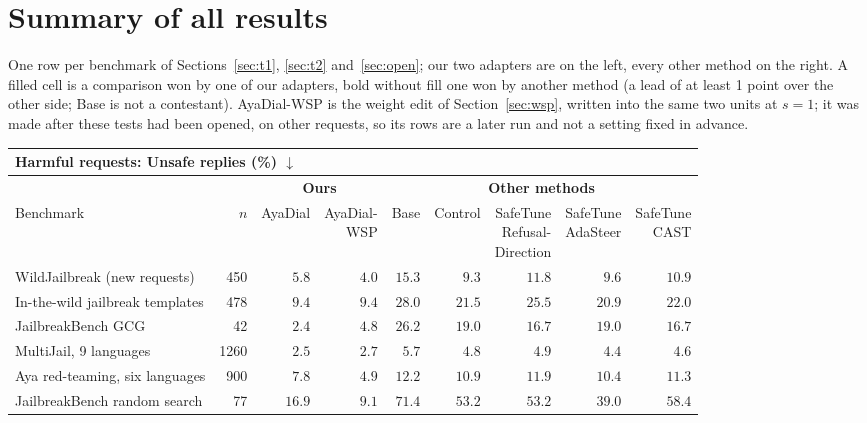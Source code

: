 \documentclass[10pt,a4paper]{article}
\renewcommand{\arraystretch}{1.12}
\begin{document}
\section{Summary of all results}\label{sec:summary}
One row per benchmark of Sections~\ref{sec:t1}, \ref{sec:t2} and~\ref{sec:open}; our two adapters are on the left, every other method on the right. A filled cell is a comparison won by one of our adapters, bold without fill one won by another method (a lead of at least 1 point over the other side; Base is not a contestant). AyaDial-WSP is the weight edit of Section~\ref{sec:wsp}, written into the same two units at $s = 1$; it was made after these tests had been opened, on other requests, so its rows are a later run and not a setting fixed in advance.

\begin{table}[H]\centering\footnotesize\renewcommand{\arraystretch}{1.3}\setlength{\tabcolsep}{4pt}\begin{tabular}{|l|r|r|r||r|r|r|r|r|}\hline
\multicolumn{9}{|l|}{\textbf{Harmful requests: Unsafe replies (\%) $\downarrow$}}\\\hline
\multicolumn{2}{|c|}{} & \multicolumn{2}{c||}{\textbf{Ours}} & \multicolumn{5}{c|}{\textbf{Other methods}}\\\hline
Benchmark & $n$ & AyaDial & \makecell{AyaDial-\\WSP} & Base & Control & \makecell{SafeTune\\Refusal-\\Direction} & \makecell{SafeTune\\AdaSteer} & \makecell{SafeTune\\CAST}\\\hline
WildJailbreak (new requests) & 450 & $5.8$ & \cellcolor{win}$\mathbf{4.0}$ & $15.3$ & $9.3$ & $11.8$ & $9.6$ & $10.9$\\\hline
In-the-wild jailbreak templates & 478 & \cellcolor{win}$\mathbf{9.4}$ & \cellcolor{win}$\mathbf{9.4}$ & $28.0$ & $21.5$ & $25.5$ & $20.9$ & $22.0$\\\hline
JailbreakBench GCG & 42 & \cellcolor{win}$\mathbf{2.4}$ & $4.8$ & $26.2$ & $19.0$ & $16.7$ & $19.0$ & $16.7$\\\hline
MultiJail, 9 languages & 1260 & \cellcolor{win}$\mathbf{2.5}$ & $2.7$ & $5.7$ & $4.8$ & $4.9$ & $4.4$ & $4.6$\\\hline
Aya red-teaming, six languages & 900 & $7.8$ & \cellcolor{win}$\mathbf{4.9}$ & $12.2$ & $10.9$ & $11.9$ & $10.4$ & $11.3$\\\hline
JailbreakBench random search & 77 & $16.9$ & \cellcolor{win}$\mathbf{9.1}$ & $71.4$ & $53.2$ & $53.2$ & $39.0$ & $58.4$\\\hline

\end{tabular}
\end{table}
\end{document}
